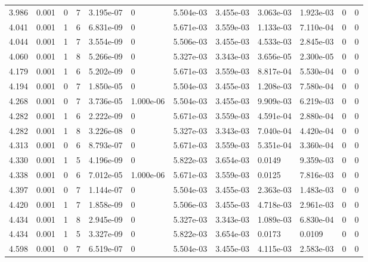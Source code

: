 \documentclass[preview]{standalone}
\begin{document}
{{{{\begin{tabular}{L{1.2cm}C{1.2cm} C{0.3cm}C{0.5cm} C{1.4cm}C{1.4cm} C{1.4cm}C{1.4cm} C{1.6cm}C{1.6cm} C{1.6cm}C{1.6cm}}
  3.986  &  0.001  & 0     &  7 &  3.195e-07  & 0  &  5.504e-03&   3.455e-03& 3.063e-03 & 1.923e-03   &  0 & 0  \\ 
  4.041  &  0.001  & 1     &  6 &  6.831e-09  & 0  &  5.671e-03&   3.559e-03& 1.133e-03 & 7.110e-04   &  0 & 0  \\ 
  4.044  &  0.001  & 1     &  7 &  3.554e-09  & 0  &  5.506e-03&   3.455e-03& 4.533e-03 & 2.845e-03   &  0 & 0  \\ 
  4.060  &  0.001  & 1     &  8 &  5.266e-09  & 0  &  5.327e-03&   3.343e-03& 3.656e-05 & 2.300e-05   &  0 & 0  \\ 
  4.179  &  0.001  & 1     &  6 &  5.202e-09  & 0  &  5.671e-03&   3.559e-03& 8.817e-04 & 5.530e-04   &  0 & 0  \\ 
  4.194  &  0.001  & 0     &  7 &  1.850e-05  & 0  &  5.504e-03&   3.455e-03& 1.208e-03 & 7.580e-04   &  0 & 0  \\ 
  4.268  &  0.001  & 0     &  7 &  3.736e-05  & 1.000e-06  &  5.504e-03&   3.455e-03& 9.909e-03 & 6.219e-03   &  0 & 0  \\ 
  4.282  &  0.001  & 1     &  6 &  2.222e-09  & 0  &  5.671e-03&   3.559e-03& 4.591e-04 & 2.880e-04   &  0 & 0  \\ 
  4.282  &  0.001  & 1     &  8 &  3.226e-08  & 0  &  5.327e-03&   3.343e-03& 7.040e-04 & 4.420e-04   &  0 & 0  \\ 
  4.313  &  0.001  & 0     &  6 &  8.793e-07  & 0  &  5.671e-03&   3.559e-03& 5.351e-04 & 3.360e-04   &  0 & 0  \\ 
  4.330  &  0.001  & 1     &  5 &  4.196e-09  & 0  &  5.822e-03&   3.654e-03& 0.0149 & 9.359e-03   &  0 & 0  \\ 
  4.338  &  0.001  & 0     &  6 &  7.012e-05  & 1.000e-06  &  5.671e-03&   3.559e-03& 0.0125 & 7.816e-03   &  0 & 0  \\ 
  4.397  &  0.001  & 0     &  7 &  1.144e-07  & 0  &  5.504e-03&   3.455e-03& 2.363e-03 & 1.483e-03   &  0 & 0  \\ 
  4.420  &  0.001  & 1     &  7 &  1.858e-09  & 0  &  5.506e-03&   3.455e-03& 4.718e-03 & 2.961e-03   &  0 & 0  \\ 
  4.434  &  0.001  & 1     &  8 &  2.945e-09  & 0  &  5.327e-03&   3.343e-03& 1.089e-03 & 6.830e-04   &  0 & 0  \\ 
  4.434  &  0.001  & 1     &  5 &  3.327e-09  & 0  &  5.822e-03&   3.654e-03& 0.0173 & 0.0109   &  0 & 0  \\ 
  4.598  &  0.001  & 0     &  7 &  6.519e-07  & 0  &  5.504e-03&   3.455e-03& 4.115e-03 & 2.583e-03   &  0 & 0  \\ 

\end{tabular}}}}}
\end{document}
